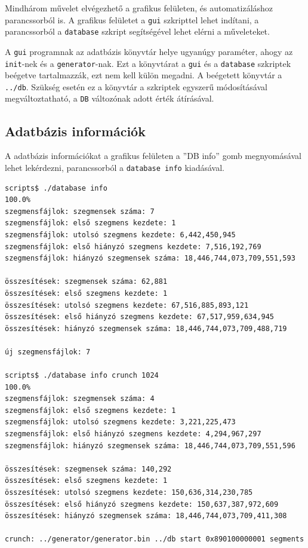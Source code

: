 Mindhárom művelet elvégezhető a grafikus felületen, és automatizáláshoz parancssorból is.
A grafikus felületet a \texttt{gui} szkripttel lehet indítani, a parancssorból a \texttt{database} szkript segítségével lehet elérni a műveleteket.

A \texttt{gui} programnak az adatbázis könyvtár helye ugyanúgy paraméter, ahogy az \texttt{init}-nek és a \texttt{generator}-nak. Ezt a könyvtárat a \texttt{gui} és a \texttt{database} szkriptek beégetve tartalmazzák, ezt nem kell külön megadni.
A beégetett könyvtár a \texttt{../db}.
Szükség esetén ez a könyvtár a szkriptek egyszerű módosításával megváltoztatható, a \texttt{DB} változónak adott érték átírásával.

\subsection{Adatbázis információk}

A adatbázis információkat a grafikus felületen a ''DB info'' gomb megnyomásával lehet
lekérdezni, parancssorból a \texttt{database info} kiadásával.

\begin{lstlisting}[language=bash]
scripts$ ./database info
100.0%
szegmensfájlok: szegmensek száma: 7
szegmensfájlok: első szegmens kezdete: 1
szegmensfájlok: utolsó szegmens kezdete: 6,442,450,945
szegmensfájlok: első hiányzó szegmens kezdete: 7,516,192,769
szegmensfájlok: hiányzó szegmensek száma: 18,446,744,073,709,551,593

összesítések: szegmensek száma: 62,881
összesítések: első szegmens kezdete: 1
összesítések: utolsó szegmens kezdete: 67,516,885,893,121
összesítések: első hiányzó szegmens kezdete: 67,517,959,634,945
összesítések: hiányzó szegmensek száma: 18,446,744,073,709,488,719

új szegmensfájlok: 7

scripts$ ./database info crunch 1024
100.0%                     
szegmensfájlok: szegmensek száma: 4
szegmensfájlok: első szegmens kezdete: 1
szegmensfájlok: utolsó szegmens kezdete: 3,221,225,473
szegmensfájlok: első hiányzó szegmens kezdete: 4,294,967,297
szegmensfájlok: hiányzó szegmensek száma: 18,446,744,073,709,551,596

összesítések: szegmensek száma: 140,292
összesítések: első szegmens kezdete: 1
összesítések: utolsó szegmens kezdete: 150,636,314,230,785
összesítések: első hiányzó szegmens kezdete: 150,637,387,972,609
összesítések: hiányzó szegmensek száma: 18,446,744,073,709,411,308

crunch: ../generator/generator.bin ../db start 0x890100000001 segments 0x400
\end{lstlisting}

